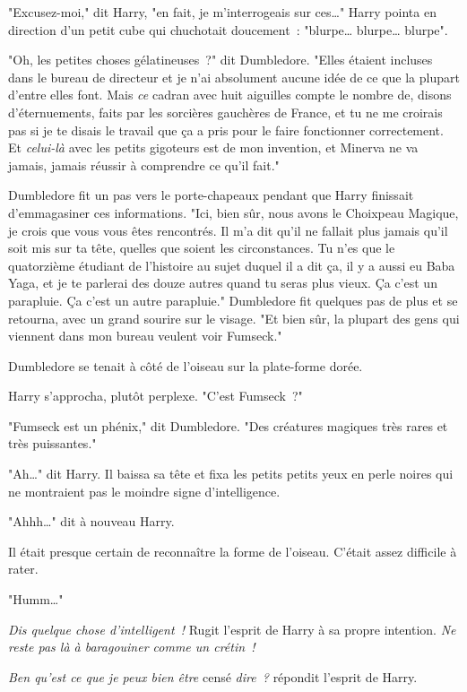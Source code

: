 "Excusez-moi," dit Harry, "en fait, je m'interrogeais sur ces…" Harry pointa en direction d'un petit cube qui chuchotait doucement~: "blurpe… blurpe… blurpe".

"Oh, les petites choses gélatineuses~?" dit Dumbledore. "Elles étaient incluses dans le bureau de directeur et je n'ai absolument aucune idée de ce que la plupart d'entre elles font. Mais \emph{ce} cadran avec huit aiguilles compte le nombre de, disons d'éternuements, faits par les sorcières gauchères de France, et tu ne me croirais pas si je te disais le travail que ça a pris pour le faire fonctionner correctement. Et \emph{celui-là} avec les petits gigoteurs est de mon invention, et Minerva ne va jamais, jamais réussir à comprendre ce qu'il fait."

Dumbledore fit un pas vers le porte-chapeaux pendant que Harry finissait d'emmagasiner ces informations. "Ici, bien sûr, nous avons le Choixpeau Magique, je crois que vous vous êtes rencontrés. Il m'a dit qu'il ne fallait plus jamais qu'il soit mis sur ta tête, quelles que soient les circonstances. Tu n'es que le quatorzième étudiant de l'histoire au sujet duquel il a dit ça, il y a aussi eu Baba Yaga, et je te parlerai des douze autres quand tu seras plus vieux. Ça c'est un parapluie. Ça c'est un autre parapluie." Dumbledore fit quelques pas de plus et se retourna, avec un grand sourire sur le visage. "Et bien sûr, la plupart des gens qui viennent dans mon bureau veulent voir Fumseck."

Dumbledore se tenait à côté de l'oiseau sur la plate-forme dorée.

Harry s'approcha, plutôt perplexe. "C'est Fumseck~?"

"Fumseck est un phénix," dit Dumbledore. "Des créatures magiques très rares et très puissantes."

"Ah…" dit Harry. Il baissa sa tête et fixa les petits petits yeux en perle noires qui ne montraient pas le moindre signe d'intelligence.

"Ahhh…" dit à nouveau Harry.

Il était presque certain de reconnaître la forme de l'oiseau. C'était assez difficile à rater.

"Humm…"

\emph{Dis quelque chose d'intelligent~!} Rugit l'esprit de Harry à sa propre intention. \emph{Ne reste pas là à baragouiner comme un crétin~!}

\emph{Ben qu'est ce que je peux bien être} censé \emph{dire~?} répondit l'esprit de Harry.

